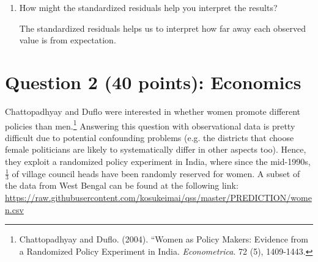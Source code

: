 \documentclass[12pt,letterpaper]{article}
\begin{document}
\begin{enumerate}
\begin{table}[h]
\begin{tabular}{l | c c c }
	
		\end{tabular}
	\end{table}
	$
	z_{11} = \frac{14-13.5}{\sqrt{13.5(1-27/42)(1-21/42)}} = 0.32 \\
	z_{12} = \frac{6-8.4}{\sqrt{8.4(1-27/42)(1-13/42)}} = -1.67   \\ 
	z_{13} = \frac{7-5}{\sqrt{5(1-27/42)(1-8/42)}} = 1.66 \\
	z_{21} = \frac{7-7.5}{\sqrt{7.5(1-15/42)(1-21/42)}} = -0.32 \\
	z_{22} = \frac{7-4.6}{\sqrt{4.6(1-15/42)(1-13/42)}} = 1.68 \\
	z_{23} = \frac{1-2.9}{\sqrt{2.9(1-15/42)(1-8/42)}} = -1.55 \\
	$
	\item [(d)] How might the standardized residuals help you interpret the results?  
	
	The standardized residuals helps us to interpret how far away each observed value is from expectation. 
	
\end{enumerate}
\newpage

\section*{Question 2 (40 points): Economics}
Chattopadhyay and Duflo were interested in whether women promote different policies than men.\footnote{Chattopadhyay and Duflo. (2004). ``Women as Policy Makers: Evidence from a Randomized Policy Experiment in India. \textit{Econometrica}. 72 (5), 1409-1443.} Answering this question with observational data is pretty difficult due to potential confounding problems (e.g. the districts that choose female politicians are likely to systematically differ in other aspects too). Hence, they exploit a randomized policy experiment in India, where since the mid-1990s, $\frac{1}{3}$ of village council heads have been randomly reserved for women. A subset of the data from West Bengal can be found at the following link: \url{https://raw.githubusercontent.com/kosukeimai/qss/master/PREDICTION/women.csv}\\
\end{document}
